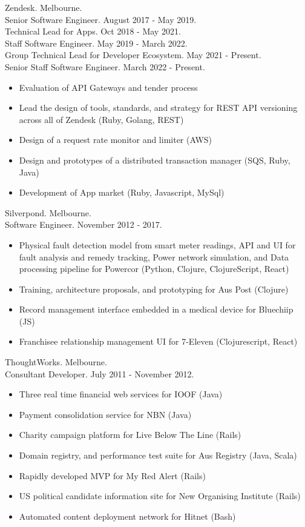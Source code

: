 \documentclass[margin]{res}
\begin{document}
\begin{resume}
  Zendesk. Melbourne. \\
  Senior Software Engineer. August 2017 - May 2019. \\
  Technical Lead for Apps. Oct 2018 - May 2021. \\
  Staff Software Engineer. May 2019 - March 2022. \\
  Group Technical Lead for Developer Ecosystem. May 2021 - Present. \\
  Senior Staff Software Engineer. March 2022 - Present.
  \begin{itemize}
  \item Evaluation of API Gateways and tender process
  \item Lead the design of tools, standards, and strategy for REST API
    versioning across all of Zendesk (Ruby, Golang, REST)
  \item Design of a request rate monitor and limiter (AWS)
  \item Design and prototypes of a distributed transaction manager (SQS, Ruby,
    Java)
  \item Development of App market (Ruby, Javascript, MySql)
  \end{itemize}

  Silverpond. Melbourne. \\
  Software Engineer.  November 2012 - 2017.
  \begin{itemize}
  \item Physical fault detection model from smart meter readings, API and UI for
    fault analysis and remedy tracking, Power network simulation, and Data
    processing pipeline for Powercor (Python, Clojure, ClojureScript, React)
  \item Training, architecture proposals, and prototyping for Aus Post (Clojure)
  \item Record management interface embedded in a medical device for Bluechiip
    (JS)
  \item Franchisee relationship management UI for 7-Eleven (Clojurescript,
    React)
  \end{itemize}

  ThoughtWorks. Melbourne. \\
  Consultant Developer.  July 2011 - November 2012.
  \begin{itemize}
  \item Three real time financial web services for IOOF (Java)
  \item Payment consolidation service for NBN (Java)
  \item Charity campaign platform for Live Below The Line (Rails)
  \item Domain registry, and performance test suite for Aus Registry (Java,
    Scala)
  \item Rapidly developed MVP for My Red Alert (Rails)
  \item US political candidate information site for New Organising Institute
    (Rails)
  \item Automated content deployment network for Hitnet (Bash)
  \end{itemize}


\end{resume}
\end{document}
